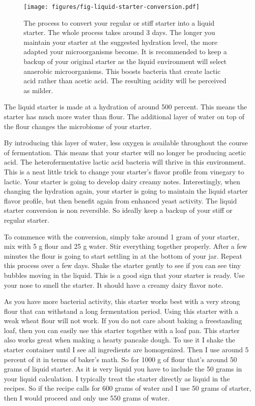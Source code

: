 \begin{figure}[!htb]
  \texttt{[image: figures/fig-liquid-starter-conversion.pdf]}
  \caption{The process to convert your regular or stiff starter into a liquid starter. The whole
  process takes around 3 days. The longer you maintain your starter at the
  suggested hydration level, the more adapted your microorganisms become. It is recommended
  to keep a backup of your original starter as the liquid environment will select
  anaerobic microorganisms. This boosts bacteria that create lactic acid rather
  than acetic acid. The resulting acidity will be perceived as milder.}
  \label{fig:liquid-starter-conversion}
\end{figure}

The liquid starter is made at a hydration of around 500 percent. This means
the starter has much more water than flour. The additional layer of water on
top of the flour changes the microbiome of your starter.

By introducing this layer of water, less oxygen is available throughout the
course of fermentation. This means that your starter will no longer be
producing acetic acid. The heterofermentative lactic acid bacteria will thrive
in this environment. This is a neat little trick to change your starter's
flavor profile from vinegary to lactic. Your starter is going to develop
dairy creamy notes. Interestingly, when changing the hydration again, your starter
is going to maintain the liquid starter flavor profile, but then benefit again
from enhanced yeast activity. The liquid starter conversion is non reversible.
So ideally keep a backup of your stiff or regular starter.

To commence with the
conversion, simply take around 1 gram of your starter, mix with 5 g flour and
25 g water. Stir everything together properly. After a few minutes the flour is
going to start settling in at the bottom of your jar. Repeat this process over
a few days. Shake the starter gently to see if you can see tiny  bubbles
moving in the liquid. This is a good sign that your starter is ready. Use your
nose to smell the starter. It should have a creamy dairy flavor note.

As you have more bacterial activity, this starter works best with a very strong
flour that can withstand a long fermentation period. Using this starter with a
weak wheat flour will not work. If you do not care about baking a freestanding loaf,
then you can easily use this starter together with a loaf pan.
This starter also works great when making a hearty pancake dough. To use it I
shake the starter container until I see all ingredients are homogenized. Then
I use around 5 percent of it in terms of baker's math. So for 1000 g of flour
that's around 50 grams of liquid starter. As it is very liquid you have to
include the 50 grams in your liquid calculation. I typically treat the starter
directly as liquid in the recipes. So if the recipe calls for 600 grams of water
and I use 50 grams of starter, then I would proceed and only use 550 grams of
water.

